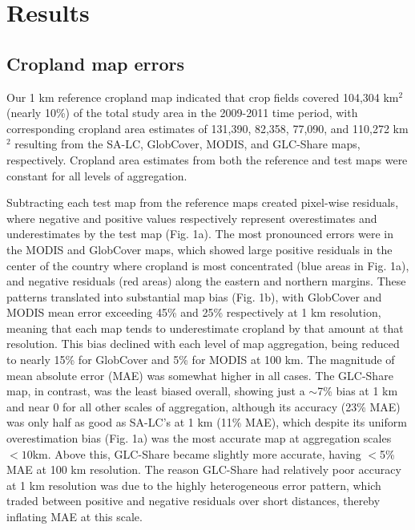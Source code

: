 \documentclass[12 pt, titlepage, a4paper]{article}
\begin{document}
\vspace{-0.5 cm}
\section*{Results}
\vspace{-0.3 cm}
\subsection*{Cropland map errors}
\vspace{-0.2 cm}
Our 1 km reference cropland map indicated that crop fields covered 104,304 km$^2$ (nearly 10\%) of the total study area in the 2009-2011 time period, with corresponding cropland area estimates of 131,390, 82,358, 77,090, and 110,272 km$^2$ resulting from the SA-LC, GlobCover, MODIS, and GLC-Share maps, respectively. Cropland area estimates from both the reference and test maps were constant for all levels of aggregation. 

Subtracting each test map from the reference maps created pixel-wise residuals, where negative and positive values respectively represent overestimates and underestimates by the test map (Fig. 1a). The most pronounced errors were in the MODIS and GlobCover maps, which showed large positive residuals in the center of the country where cropland is most concentrated (blue areas in Fig. 1a), and negative residuals (red areas) along the eastern and northern margins.
These patterns translated into substantial map bias (Fig. 1b), with GlobCover and MODIS mean error exceeding 45\% and 25\% respectively at 1 km resolution, meaning that each map tends to underestimate cropland by that amount at that resolution. This bias declined with each level of map aggregation, being reduced to nearly 15\% for GlobCover and 5\% for MODIS at 100 km. The magnitude of mean absolute error (MAE) was somewhat higher in all cases. The GLC-Share map, in contrast, was the least biased overall, showing just a $\sim$7\% bias at 1 km and near 0 for all other scales of aggregation, although its accuracy (23\% MAE) was only half as good as SA-LC's at 1 km (11\% MAE), which despite its uniform overestimation bias (Fig. 1a) was the most accurate map at aggregation scales $<10$km. Above this, GLC-Share became slightly more accurate, having $<$5\% MAE at 100 km resolution. The reason GLC-Share had relatively poor accuracy at 1 km resolution was due to the highly heterogeneous error pattern, which traded between positive and negative residuals over short distances, thereby inflating MAE at this scale.  
\end{document}
